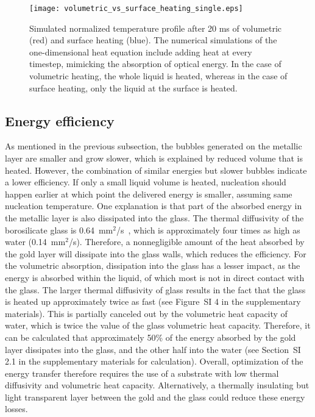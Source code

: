 \documentclass[11pt]{article}
\begin{document}
\begin{figure}
	\centering
	\texttt{[image: volumetric\_vs\_surface\_heating\_single.eps]}
	\caption{Simulated normalized temperature profile after 20 ms of volumetric (red) and surface heating (blue). The numerical simulations of the one-dimensional heat equation include adding heat at every timestep, mimicking the absorption of optical energy. In the case of volumetric heating, the whole liquid is heated, whereas in the case of surface heating, only the liquid at the surface is heated.}
	\label{C4: fig: volumetric vs surface heating 20 ms}
\end{figure}

\subsection{Energy efficiency}
As mentioned in the previous subsection, the bubbles generated on the metallic layer are smaller and grow slower, which is explained by reduced volume that is heated. However, the combination of similar energies but slower bubbles indicate a lower efficiency. If only a small liquid volume is heated, nucleation should happen earlier at which point the delivered energy is smaller, assuming same nucleation temperature. One explanation is that part of the absorbed energy in the metallic layer is also dissipated into the glass. The thermal diffusivity of the borosilicate glass is 0.64~mm$^{2}$/s~\cite{Schott_Thermal}, which is approximately four times as high as water (0.14~mm$^{2}$/s). Therefore, a nonnegligible amount of the heat absorbed by the gold layer will dissipate into the glass walls, which reduces the efficiency. For the volumetric absorption, dissipation into the glass has a lesser impact, as the energy is absorbed within the liquid, of which most is not in direct contact with the glass. The larger thermal diffusivity of glass results in the fact that the glass is heated up approximately twice as fast (see Figure~SI 4 in the supplementary materials). This is partially canceled out by the volumetric heat capacity of water, which is twice the value of the glass volumetric heat capacity. Therefore, it can be calculated that approximately 50\% of the energy absorbed by the gold layer dissipates into the glass, and the other half into the water (see Section~SI 2.1 in the supplementary materials for calculation). Overall, optimization of the energy transfer therefore requires the use of a substrate with low thermal diffusivity and volumetric heat capacity. Alternatively, a thermally insulating but light transparent layer between the gold and the glass could reduce these energy losses.
\end{document}
